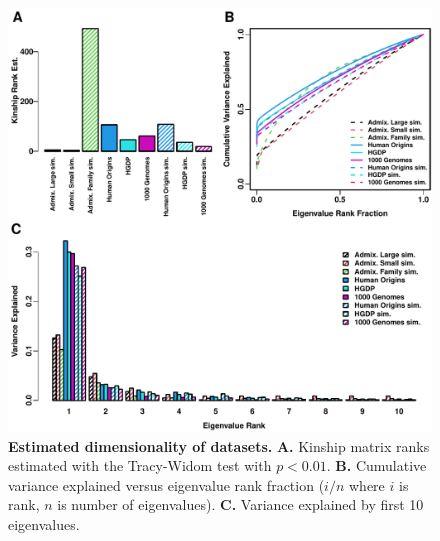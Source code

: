 \documentclass[11pt]{article}
\begin{document}
\begin{figure}[bp!]
  \centering
  \includegraphics[width=\textwidth]{eigen.pdf}
  \caption{
    {\bf Estimated dimensionality of datasets.}
    \textbf{A.}
    Kinship matrix ranks estimated with the Tracy-Widom test with $p < 0.01$.
    \textbf{B.}
    Cumulative variance explained versus eigenvalue rank fraction ($i/n$ where $i$ is rank, $n$ is number of eigenvalues).
    \textbf{C.}
    Variance explained by first 10 eigenvalues.
  }
  \label{fig:eigen}
\end{figure}
\end{document}
